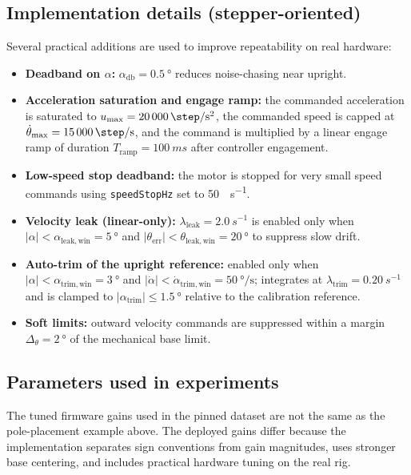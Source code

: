 \subsection{Implementation details (stepper-oriented)}
Several practical additions are used to improve repeatability on real hardware:
\begin{itemize}
  \item \textbf{Deadband on $\alpha$:} $\alpha_{\mathrm{db}}=\SI{0.5}{\degree}$ reduces noise-chasing near upright.
  \item \textbf{Acceleration saturation and engage ramp:} the commanded acceleration is saturated to $u_{\max}=\SI{20000}{\step\per\second\squared}$, the commanded speed is capped at $\dot{\theta}_{\max}=\SI{15000}{\step\per\second}$, and the command is multiplied by a linear engage ramp of duration $T_{\mathrm{ramp}}=\SI{100}{ms}$ after controller engagement.
  \item \textbf{Low-speed stop deadband:} the motor is stopped for very small speed commands using \texttt{speedStopHz} set to \SI{50}{\step\per\second}.
  \item \textbf{Velocity leak (linear-only):} $\lambda_{\mathrm{leak}}=\SI{2.0}{s^{-1}}$ is enabled only when $|\alpha|<\alpha_{\mathrm{leak,win}}=\SI{5}{\degree}$ and $|\theta_{\mathrm{err}}|<\theta_{\mathrm{leak,win}}=\SI{20}{\degree}$ to suppress slow drift.
  \item \textbf{Auto-trim of the upright reference:} enabled only when $|\alpha|<\alpha_{\mathrm{trim,win}}=\SI{3}{\degree}$ and $|\dot{\alpha}|<\dot{\alpha}_{\mathrm{trim,win}}=\SI{50}{\degree\per\second}$; integrates at $\lambda_{\mathrm{trim}}=\SI{0.20}{s^{-1}}$ and is clamped to $|\alpha_{\mathrm{trim}}|\le \SI{1.5}{\degree}$ relative to the calibration reference.
  \item \textbf{Soft limits:} outward velocity commands are suppressed within a margin $\Delta_\theta=\SI{2}{\degree}$ of the mechanical base limit.
\end{itemize}

\subsection{Parameters used in experiments}
The tuned firmware gains used in the pinned dataset are not the same as the pole-placement example above. The deployed gains differ because the implementation separates sign conventions from gain magnitudes, uses stronger base centering, and includes practical hardware tuning on the real rig.


